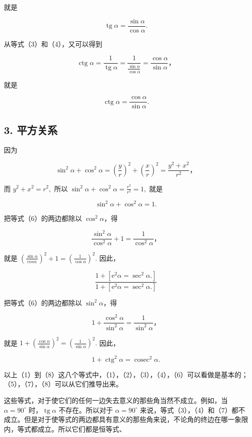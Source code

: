 就是

\[
\operatorname{tg}\alpha=\frac{\sin\alpha}{\cos\alpha}. \tag {4}
\]

从等式（3）和（4），又可以得到

\[
\operatorname{ctg} \alpha = \frac {1}{\operatorname{tg} \alpha} = \frac {1}{\frac {\sin \alpha}{\cos \alpha}} = \frac {\cos \alpha}{\sin \alpha}\text{，}
\]

就是

\[
\operatorname{ctg} \alpha = \frac {\cos \alpha}{\sin \alpha}. \tag {5}
\]

\subsection{3. 平方关系}

因为

\[
\sin^ {2} \alpha + \cos^ {2} \alpha = \left(\frac {y}{r}\right) ^ {2} + \left(\frac {x}{r}\right) ^ {2} = \frac {y ^ {2} + x ^ {2}}{r ^ {2}}\text{，}
\]

而 \(y^{2} + x^{2} = r^{2},\) 所以
\(\sin^2\alpha +\cos^2\alpha = \frac{r^2}{r^2} = 1,\) 就是

\[
\boxed {\sin^ {2} \alpha + \cos^ {2} \alpha = 1.} \tag {6}
\]

把等式（6）的两边都除以 \(\cos^2\alpha\)，得

\[
\frac {\sin^ {2} \alpha}{\cos^ {2} \alpha} + 1 = \frac {1}{\cos^ {2} \alpha}\text{，}
\]

就是
\(\left(\frac{\sin\alpha}{cos\alpha}\right)^2 + 1 = \left(\frac{1}{\cos\alpha}\right)^2.\)
因此，

\[
\frac {1 + \left[ \mathrm{e} ^ {2} \alpha = \sec^ {2} \alpha . \right]}{1 + \left[ \mathrm{e} ^ {2} \alpha = \sec^ {2} \alpha . \right]} \tag {7}
\]

把等式（6）的两边都除以 \(\sin^2\alpha\)，得

\[
1 + \frac {\cos^ {2} \alpha}{\sin^ {2} \alpha} = \frac {1}{\sin^ {2} \alpha}\text{，}
\]

就是
\(1 + \left(\frac{\cos\alpha}{\sin\alpha}\right)^2 = \left(\frac{1}{\sin\alpha}\right)^2.\)
因此，

\[
\boxed{1+\operatorname{ctg}^2\alpha=\operatorname{cosec}^2\alpha.} \tag {8}
\]

以上（1）到（8）这八个等式中，（1），（2），（3），（4），（6）可以看做是基本的；（5），（7），（8）可以从它们推导出来。

这些等式，对于使它们的任何一边失去意义的那些角当然不成立。例如，当
\(\alpha = 90^{\circ}\) 时，\(\operatorname{tg} \alpha\)
不存在。所以对于 \(\alpha = 90^{\circ}\)
来说，等式（3），（4）和（7）都不成立。但是对于使等式的两边都具有意义的那些角来说，不论角的终边在哪一象限内，等式都成立。所以它们都是恒等式、


